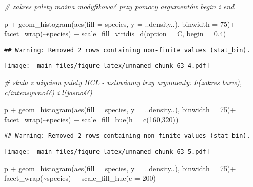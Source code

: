 \documentclass[
]{book}
\newenvironment{Shaded}{\begin{snugshade}}{\end{snugshade}}
\newcommand{\AttributeTok}[1]{\textcolor[rgb]{0.77,0.63,0.00}{#1}}
\newcommand{\CommentTok}[1]{\textcolor[rgb]{0.56,0.35,0.01}{\textit{#1}}}
\newcommand{\DecValTok}[1]{\textcolor[rgb]{0.00,0.00,0.81}{#1}}
\newcommand{\FloatTok}[1]{\textcolor[rgb]{0.00,0.00,0.81}{#1}}
\newcommand{\FunctionTok}[1]{\textcolor[rgb]{0.00,0.00,0.00}{#1}}
\newcommand{\NormalTok}[1]{#1}
\newcommand{\SpecialCharTok}[1]{\textcolor[rgb]{0.00,0.00,0.00}{#1}}
\newcommand{\StringTok}[1]{\textcolor[rgb]{0.31,0.60,0.02}{#1}}
\begin{document}
\begin{Shaded}
\begin{Highlighting}[]
\CommentTok{\# zakres palety można modyfikować przy pomocy argumentów begin i end}

\NormalTok{p }\SpecialCharTok{+} \FunctionTok{geom\_histogram}\NormalTok{(}\FunctionTok{aes}\NormalTok{(}\AttributeTok{fill =}\NormalTok{ species, }\AttributeTok{y =}\NormalTok{ ..density..), }\AttributeTok{binwidth =} \DecValTok{75}\NormalTok{)}\SpecialCharTok{+}
  \FunctionTok{facet\_wrap}\NormalTok{(}\SpecialCharTok{\textasciitilde{}}\NormalTok{species) }\SpecialCharTok{+} \FunctionTok{scale\_fill\_viridis\_d}\NormalTok{(}\AttributeTok{option =} \StringTok{\textquotesingle{}C\textquotesingle{}}\NormalTok{, }\AttributeTok{begin =} \FloatTok{0.4}\NormalTok{)}
\end{Highlighting}
\end{Shaded}

\begin{verbatim}
## Warning: Removed 2 rows containing non-finite values (stat_bin).
\end{verbatim}

\texttt{[image: \_main\_files/figure-latex/unnamed-chunk-63-4.pdf]}

\begin{Shaded}
\begin{Highlighting}[]
\CommentTok{\# skala z użyciem palety HCL {-} ustawiamy trzy argumenty: h(zakres barw), c(intensywność) i l(jasność)}

\NormalTok{p }\SpecialCharTok{+} \FunctionTok{geom\_histogram}\NormalTok{(}\FunctionTok{aes}\NormalTok{(}\AttributeTok{fill =}\NormalTok{ species, }\AttributeTok{y =}\NormalTok{ ..density..), }\AttributeTok{binwidth =} \DecValTok{75}\NormalTok{)}\SpecialCharTok{+}
  \FunctionTok{facet\_wrap}\NormalTok{(}\SpecialCharTok{\textasciitilde{}}\NormalTok{species) }\SpecialCharTok{+} \FunctionTok{scale\_fill\_hue}\NormalTok{(}\AttributeTok{h =} \FunctionTok{c}\NormalTok{(}\DecValTok{160}\NormalTok{,}\DecValTok{320}\NormalTok{))}
\end{Highlighting}
\end{Shaded}

\begin{verbatim}
## Warning: Removed 2 rows containing non-finite values (stat_bin).
\end{verbatim}

\texttt{[image: \_main\_files/figure-latex/unnamed-chunk-63-5.pdf]}

\begin{Shaded}
\begin{Highlighting}[]
\NormalTok{p }\SpecialCharTok{+} \FunctionTok{geom\_histogram}\NormalTok{(}\FunctionTok{aes}\NormalTok{(}\AttributeTok{fill =}\NormalTok{ species, }\AttributeTok{y =}\NormalTok{ ..density..), }\AttributeTok{binwidth =} \DecValTok{75}\NormalTok{)}\SpecialCharTok{+}
  \FunctionTok{facet\_wrap}\NormalTok{(}\SpecialCharTok{\textasciitilde{}}\NormalTok{species) }\SpecialCharTok{+} \FunctionTok{scale\_fill\_hue}\NormalTok{(}\AttributeTok{c =} \DecValTok{200}\NormalTok{)}
\end{Highlighting}
\end{Shaded}
\end{document}
